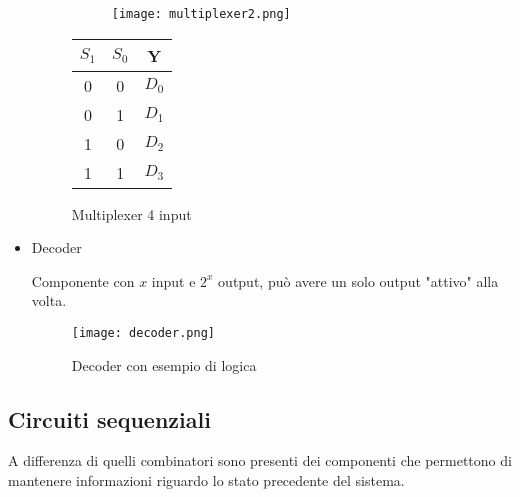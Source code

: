 \documentclass{article}
\begin{document}
\begin{itemize}
\begin{figure}[ht]
    \begin{minipage}[t]{0.49\textwidth}
        \centering
        \begin{figure}[H]
        \centering
        \texttt{[image: multiplexer2.png]}
        \end{figure}
        \label{fig:multiplexer2}
    \end{minipage}
    \begin{minipage}[t]{0.49\textwidth}
    \centering
        \begin{table}[H]
        \centering
        \begin{tabular}{cc|c}
            $S_1$ & $S_0 $ & Y\\
            \hline
            0 & 0 & $D_0$\\
            \hline
            0 & 1 & $D_1$\\
            \hline
            1 & 0 & $D_2$\\
            \hline
            1 & 1 & $D_3$\\
        \end{tabular}
    \label{tab:multiplexer2}
    \end{table}
\end{minipage}
\caption{Multiplexer 4 input}
\end{figure}

\newpage

\item Decoder

Componente con $x$ input e $2^x$ output, può avere un solo output "attivo" alla volta.

\vspace{5pt}

\begin{figure}[ht]
    \centering
    \texttt{[image: decoder.png]}
    \caption{Decoder con esempio di logica}
    \label{fig:decoder}
\end{figure}
    
\end{itemize}

\subsection{Circuiti sequenziali}

A differenza di quelli combinatori sono presenti dei componenti che permettono di mantenere informazioni riguardo lo stato precedente del sistema.
\end{document}
